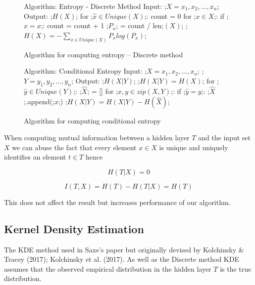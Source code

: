 \documentclass[dissertation.tex]{subfiles}
\begin{document}
\begin{figure}[H]
    \begin{pythonfigure}
      Algorithm: Entropy - Discrete Method
      Input: ;$X = x_1, x_2,...,x_n$;
      Output: ;$H(X)$;
      for ;$ \hat{x}\in Unique(X)$;:
        count = 0       
        for ;$x \in X$;:
          if ;$\hat{x} = x$;:
            count = count + 1
        ;$P_x$; = count / len;$(X)$;
      ;$H(X) = - \sum _{x\in Unique(X)} P_x log(P_x)$; 
    \end{pythonfigure}
    \caption{Algorithm for computing entropy -- Discrete method}
    \label{fig:entropy1}
\end{figure} 

\begin{figure}[H]
    \begin{pythonfigure}
      Algorithm: Conditional Entropy
      Input: 
      ;$X = x_1, x_2,...,x_n$;
      ;$Y = y_1, y_2,...,y_n$;
      Output: ;$H(X|Y)$;
      ;$H(X|Y) = H(X)$;
      for ;$ \hat{y}\in Unique(Y)$;:
        ;$\hat{X}$; = []
        for ;$x, y \in zip(X, Y)$;:
          if ;$\hat{y} = y$;:
            ;$\hat{X}$;.append(;$x$;)
          ;$H(X|Y) = H(X|Y) - H(\hat{X})$;
    \end{pythonfigure}
    \caption{Algorithm for computing conditional entropy}
    \label{fig:entropy2}
\end{figure}

When computing mutual information between a hidden layer $T$ and the input set
$X$ we can abuse the fact that every element $x\in X$ is unique and uniquely
identifies an element $t\in T$ hence 

\begin{equation}
  H(T|X) = 0 
\end{equation}

\begin{equation}
  I(T, X) = H(T) - H(T|X) = H(T) 
\end{equation}

This does not affect the result but increases performance of our algorithm.

\subsection{Kernel Density Estimation}

  The KDE method used in Saxe's paper but originally devised by Kolchinsky \&
  Tracey (2017); Kolchinsky et al. (2017). As well as the Discrete method KDE
  assumes that the observed empirical distribution in the hidden layer $T$ is
  the true distribution. 
\end{document}
